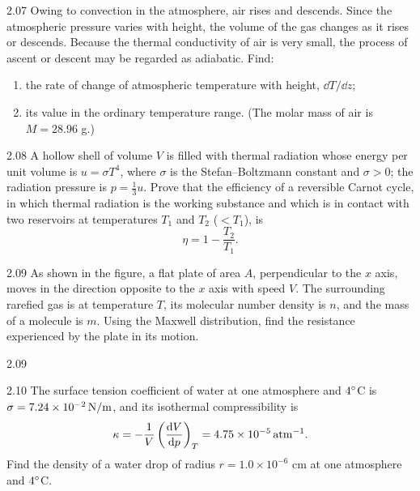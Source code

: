 \begin{problem}{2.07}
Owing to convection in the atmosphere, air rises and descends. Since the atmospheric pressure varies with height, the volume of the gas changes as it rises or descends. Because the thermal conductivity of air is very small, the process of ascent or descent may be regarded as adiabatic. Find:
\begin{enumerate}[label=(\arabic*),leftmargin=2.2em,itemsep=1pt,topsep=2pt]
\item the rate of change of atmospheric temperature with height, $\dd T/\dd z$;
\item its value in the ordinary temperature range. (The molar mass of air is $M = 28.96$ g.)
\end{enumerate}
\end{problem}

\begin{problem}{2.08}
A hollow shell of volume $V$ is filled with thermal radiation whose energy per unit volume is $u = \sigma T^4$, where $\sigma$ is the Stefan--Boltzmann constant and $\sigma > 0$; the radiation pressure is $p = \frac{1}{3}u$. Prove that the efficiency of a reversible Carnot cycle, in which thermal radiation is the working substance and which is in contact with two reservoirs at temperatures $T_1$ and $T_2$ ($< T_1$), is
\[
\eta = 1-\frac{T_2}{T_1}.
\]
\end{problem}

\begin{problem}{2.09}
As shown in the figure, a flat plate of area $A$, perpendicular to the $x$ axis, moves in the direction opposite to the $x$ axis with speed $V$. The surrounding rarefied gas is at temperature $T$, its molecular number density is $n$, and the mass of a molecule is $m$. Using the Maxwell distribution, find the resistance experienced by the plate in its motion.
\end{problem}

\begin{figbox}{2.09}
\end{figbox}

\begin{problem}{2.10}
The surface tension coefficient of water at one atmosphere and $4^{\circ}$C is $\sigma = 7.24\times10^{-2}\,\mathrm{N/m}$, and its isothermal compressibility is
\[
\kappa = -\frac{1}{V}\left(\frac{\mathrm{d} V}{\mathrm{d} p}\right)_T = 4.75\times10^{-5}\,\mathrm{atm}^{-1}.
\]
Find the density of a water drop of radius $r = 1.0\times10^{-6}$ cm at one atmosphere and $4^{\circ}$C.
\end{problem}

